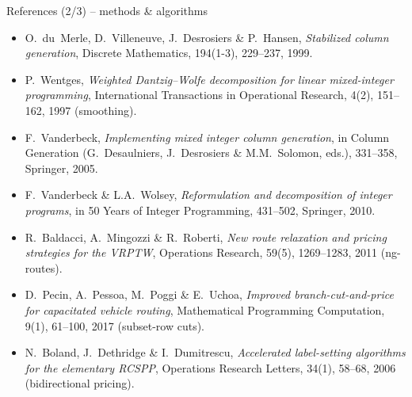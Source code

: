 \documentclass[10pt,aspectratio=169]{beamer}
\begin{document}
\begin{frame}{References (2/3) -- methods \& algorithms}
  \scriptsize
  \begin{itemize}\setlength{\itemsep}{2pt}
    \item O.~du~Merle, D.~Villeneuve, J.~Desrosiers \& P.~Hansen,
          \emph{Stabilized column generation}, Discrete Mathematics,
          194(1-3), 229--237, 1999.
    \item P.~Wentges, \emph{Weighted Dantzig--Wolfe decomposition for linear
          mixed-integer programming}, International Transactions in
          Operational Research, 4(2), 151--162, 1997 (smoothing).
    \item F.~Vanderbeck, \emph{Implementing mixed integer column generation},
          in Column Generation (G.~Desaulniers, J.~Desrosiers \& M.M.~Solomon,
          eds.), 331--358, Springer, 2005.
    \item F.~Vanderbeck \& L.A.~Wolsey, \emph{Reformulation and decomposition
          of integer programs}, in 50 Years of Integer Programming, 431--502,
          Springer, 2010.
    \item R.~Baldacci, A.~Mingozzi \& R.~Roberti, \emph{New route relaxation
          and pricing strategies for the VRPTW}, Operations Research,
          59(5), 1269--1283, 2011 (ng-routes).
    \item D.~Pecin, A.~Pessoa, M.~Poggi \& E.~Uchoa, \emph{Improved
          branch-cut-and-price for capacitated vehicle routing}, Mathematical
          Programming Computation, 9(1), 61--100, 2017 (subset-row cuts).
    \item N.~Boland, J.~Dethridge \& I.~Dumitrescu, \emph{Accelerated
          label-setting algorithms for the elementary RCSPP}, Operations
          Research Letters, 34(1), 58--68, 2006 (bidirectional pricing).
  \end{itemize}
\end{frame}
\end{document}
